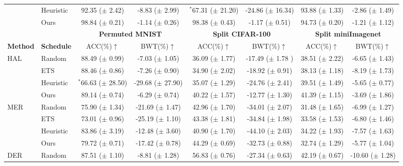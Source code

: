 \begin{table}[t]
{\begin{tabular}{l l c c c c c c}
         & Heuristic & 92.35 ($\pm$ 2.42) & -8.83 ($\pm$ 2.99) & $^{*}$67.31 ($\pm$ 21.20) & -24.86 ($\pm$ 16.34) & 93.88 ($\pm$ 1.33) & -2.86 ($\pm$ 1.49) \\
         & Ours & 98.84 ($\pm$ 0.21)  & -1.14 ($\pm$ 0.26)  & 98.38 ($\pm$ 0.43) & -1.17 ($\pm$ 0.51) & 94.73 ($\pm$ 0.20) & -1.21 ($\pm$ 1.12) \\
        \midrule
        \midrule
         & & \multicolumn{2}{c}{{\bf Permuted MNIST} } & \multicolumn{2}{c}{{\bf Split CIFAR-100} } & \multicolumn{2}{c}{{\bf Split miniImagenet} } \\
         \cmidrule{3-4} \cmidrule{5-6} \cmidrule{7-8} %
         {\bf Method} & {\bf Schedule} & ACC(\%)$\uparrow$ & BWT(\%)$\uparrow$ & ACC(\%)$\uparrow$ & BWT(\%)$\uparrow$ & ACC(\%)$\uparrow$ & BWT(\%)$\uparrow$ \\
        \midrule 
        \multirow{4}{*}{HAL} & Random & 88.49 ($\pm$ 0.99) & -7.03 ($\pm$ 1.05) & 36.09 ($\pm$ 1.77) & -17.49 ($\pm$ 1.78 ) & 38.51 ($\pm$ 2.22) & -6.65 ($\pm$ 1.43) \\
         & ETS & 88.46 ($\pm$ 0.86) & -7.26 ($\pm$ 0.90) & 34.90 ($\pm$ 2.02) & -18.92 ($\pm$ 0.91) & 38.13 ($\pm$ 1.18) & -8.19 ($\pm$ 1.73) \\
         & Heuristic & $^{*}$66.63 ($\pm$ 28.50) & -29.68 ($\pm$ 27.90) & 35.07 ($\pm$ 1.29) & -24.76 ($\pm$ 2.41) & 39.51 ($\pm$ 1.49) & -5.65 ($\pm$ 0.77) \\
         & Ours & 89.14 ($\pm$ 0.74) & -6.29 ($\pm$ 0.74) & 40.22 ($\pm$ 1.57) & -12.77 ($\pm$ 1.30) & 41.39 ($\pm$ 1.15) & -3.69 ($\pm$ 1.86) \\
        \midrule 
        \multirow{4}{*}{MER} & Random & 75.90 ($\pm$ 1.34) & -21.69 ($\pm$ 1.47) & 42.96 ($\pm$ 1.70) & -34.01 ($\pm$ 2.07) & 31.48 ($\pm$ 1.65) & -6.99 ($\pm$ 1.27) \\
         & ETS & 73.01 ($\pm$ 0.96) & -25.19 ($\pm$ 1.10) & 43.38 ($\pm$ 1.81) & -34.84 ($\pm$ 1.98) & 33.58 ($\pm$ 1.53) & -6.80 ($\pm$ 1.46) \\
         & Heuristic & 83.86 ($\pm$ 3.19) & -12.48 ($\pm$ 3.60) & 40.90 ($\pm$ 1.70) & -44.10 ($\pm$ 2.03) & 34.22 ($\pm$ 1.93) & -7.57 ($\pm$ 1.63) \\
         & Ours & 79.72 ($\pm$ 0.71) & -17.42 ($\pm$ 0.78) & 44.29 ($\pm$ 0.69) & -32.73 ($\pm$ 0.88) & 32.74 ($\pm$ 1.29) & -5.77 ($\pm$ 1.04) \\
        \midrule 
        \multirow{4}{*}{DER} & Random & 87.51 ($\pm$ 1.10) & -8.81 ($\pm$ 1.28) & 56.83 ($\pm$ 0.76) & -27.34 ($\pm$ 0.63) & 42.19  ($\pm$ 0.67) & -10.60  ($\pm$ 1.28) \\

\end{tabular}}
\end{table}
